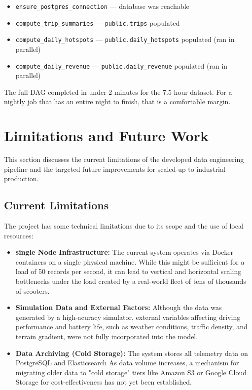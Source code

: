 \documentclass[conference]{IEEEtran}
\begin{document}
\begin{itemize}
    \item \texttt{ensure\_postgres\_connection} --- database was reachable
    \item \texttt{compute\_trip\_summaries} --- \texttt{public.trips} populated
    \item \texttt{compute\_daily\_hotspots} --- \texttt{public.daily\_hotspots} populated (ran in parallel)
    \item \texttt{compute\_daily\_revenue} --- \texttt{public.daily\_revenue} populated (ran in parallel)
\end{itemize}

The full DAG completed in under 2 minutes for the 7.5 hour dataset. For a nightly job that has an entire night to finish, that is a comfortable margin.

\section{Limitations and Future Work}

This section discusses the current limitations of the developed data engineering pipeline and the targeted future improvements for scaled-up to industrial production.

\subsection{Current Limitations}
The project has some technical limitations due to its scope and the use of local resources:
\begin{itemize}
    \item \textbf{single Node Infrastructure:} The current system operates via Docker containers on a single physical machine. While this might be sufficient for a load of 50 records per second, it can lead to vertical and horizontal scaling bottlenecks under the load created by a real-world fleet of tens of thousands of scooters.
    \item \textbf{Simulation Data and External Factors:} Although the data was generated by a high-acuracy simulator, external variables affecting driving performance and battery life, such as weather conditions, traffic density, and terrain gradient, were not fully incorporated into the model.
    \item \textbf{Data Archiving (Cold Storage):} The system stores all telemetry data on PostgreSQL and Elasticsearch As data volume increases, a mechanism for migrating older data to "cold storage" tiers like Amazon S3 or Google Cloud Storage for cost-effectiveness has not yet been established.
\end{itemize}
\end{document}

